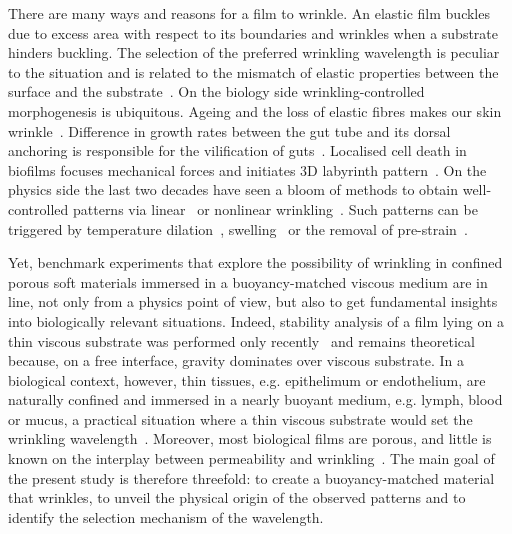 \documentclass[twocolumn,superscriptaddress,showpacs,preprintnumbers, amsmath,amssymb,prl]{revtex4-1}
\begin{document}
There are many ways and reasons for a film to wrinkle. An elastic film buckles due to excess area with respect to its boundaries and wrinkles when a substrate hinders buckling. The selection of the preferred wrinkling wavelength is peculiar to the situation and is related to the mismatch of elastic properties between the surface and the substrate~\cite{Gough1940, Bijlaard1946, Biot1957, Bowden1998, Cerda2003, Genzer2006}. On the biology side wrinkling-controlled morphogenesis is ubiquitous. Ageing and the loss of elastic fibres makes our skin wrinkle~\cite{Bissett1987, Genzer2006}. Difference in growth rates between the gut tube and its dorsal anchoring is responsible for the vilification of guts~\cite{Savin2011, Ciarletta2014, Shyer2013}. Localised cell death in biofilms focuses mechanical forces and initiates 3D labyrinth pattern~\cite{Trejo2013, Asally2012}. On the physics side the last two decades have seen a bloom of methods to obtain well-controlled patterns via linear~\cite{Bowden1998, Genzer2006, Hu1998, Kim2010, Vandeparre2011, Li2013} or nonlinear wrinkling~\cite{Efimenko2005, Guvendiren2010, Kim2011a, Brau2011}. Such patterns can be triggered by temperature dilation~\cite{Bowden1998}, swelling~\cite{Hu1998,Kim2010} or the removal of pre-strain~\cite{Genzer2006}. 



Yet, benchmark experiments that explore the possibility of wrinkling in confined porous soft materials immersed in a buoyancy-matched viscous medium are in line, not only from a physics point of view, but also to get fundamental insights into biologically relevant situations. Indeed, stability analysis of a film lying on a thin viscous substrate was performed only recently~\cite{Huang2002} and remains theoretical because, on a free interface, gravity dominates over viscous substrate. In a biological context, however, thin tissues, e.g. epithelimum or endothelium, are naturally confined and immersed in a nearly buoyant medium, e.g. lymph, blood or mucus, a practical situation where a thin viscous substrate would set the wrinkling wavelength~\cite{Fleury2015}. Moreover, most biological films are porous, and little is known on the interplay between permeability and wrinkling~\cite{Ma2004,Longley2013}. The main goal of the present study is therefore threefold: to create a buoyancy-matched material that wrinkles, to unveil the physical origin of the observed patterns and to identify the selection mechanism of the wavelength.
\end{document}
